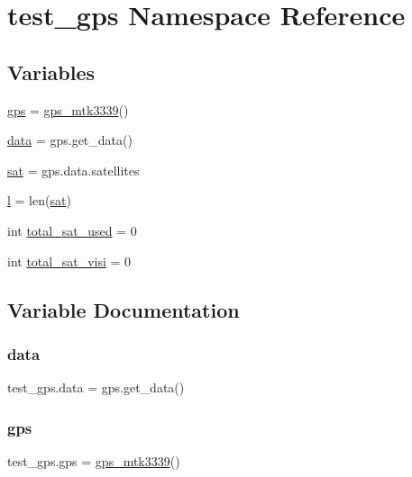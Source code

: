 \hypertarget{namespacetest__gps}{}\section{test\+\_\+gps Namespace Reference}
\label{namespacetest__gps}
\subsection*{Variables}
\begin{DoxyCompactItemize}
\item 
\hyperlink{namespacetest__gps_a615aa948f796bd96cbf54dfc9d74a9a4}{gps} = \hyperlink{classgps__mtk3339_1_1gps__mtk3339}{gps\+\_\+mtk3339}()
\item 
\hyperlink{namespacetest__gps_a2575b1127c91b40997b564e7f01c17a1}{data} = gps.\+get\+\_\+data()
\item 
\hyperlink{namespacetest__gps_a87fb327a7a81a1e79adc898957af3537}{sat} = gps.\+data.\+satellites
\item 
\hyperlink{namespacetest__gps_af8b5ef66844d4785cb6931c2368a8742}{l} = len(\hyperlink{namespacetest__gps_a87fb327a7a81a1e79adc898957af3537}{sat})
\item 
int \hyperlink{namespacetest__gps_a607b15d53a10e06c14767aab7632ab51}{total\+\_\+sat\+\_\+used} = 0
\item 
int \hyperlink{namespacetest__gps_a2624b8bcc1b0efe5e760ca2aafe64242}{total\+\_\+sat\+\_\+visi} = 0
\end{DoxyCompactItemize}


\subsection{Variable Documentation}
\mbox{\label{namespacetest__gps_a2575b1127c91b40997b564e7f01c17a1}} 
\subsubsection{\texorpdfstring{data}{data}}
{\footnotesize\ttfamily test\+\_\+gps.\+data = gps.\+get\+\_\+data()}

\mbox{\label{namespacetest__gps_a615aa948f796bd96cbf54dfc9d74a9a4}} 
\subsubsection{\texorpdfstring{gps}{gps}}
{\footnotesize\ttfamily test\+\_\+gps.\+gps = \hyperlink{classgps__mtk3339_1_1gps__mtk3339}{gps\+\_\+mtk3339}()}

